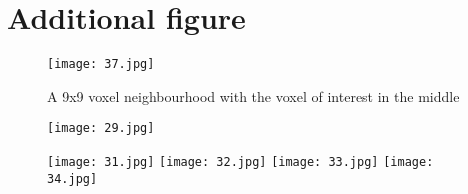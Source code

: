 \section{Additional figure}

\begin{figure}[!htbp]
\centering
\texttt{[image: 37.jpg]}
\caption{A 9x9 voxel neighbourhood with the voxel of interest in the middle}\label{figtoda1}
\end{figure}

\begin{figure}[!htbp]
\centering
\texttt{[image: 29.jpg]}
\caption{}
\end{figure}

\begin{figure}[!htbp]
%
\centering
\texttt{[image: 31.jpg]}
\label{LoveNadya1}
\endminipage\hfill
{}%
\centering
\texttt{[image: 32.jpg]}
\subcaption{}
\endminipage\hfill
{}%
\centering
\texttt{[image: 33.jpg]}
\subcaption{}
\endminipage\hfill
{}%
\centering
\texttt{[image: 34.jpg]}
\subcaption{}
\endminipage\hfill
\caption{}
\end{figure}

